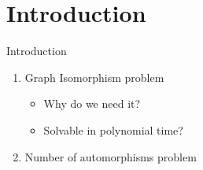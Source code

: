 \section{Introduction}

\begin{frame}{Introduction}
\begin{enumerate}[<+->]
  \item {
    Graph Isomorphism problem
    \begin{itemize}
        \item\uncover Why do we need it?
        \item\uncover Solvable in polynomial time?
    \end{itemize}
  }
  \item Number of automorphisms problem
\end{enumerate}
\end{frame}
